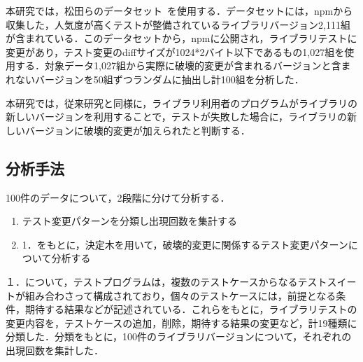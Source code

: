 \documentclass[uplatex,dvipdfmx,a4paper,twocolumn,base=11pt,jbase=11pt,ja=standard]{bxjsarticle}  %
\begin{document}
本研究では，松田らのデータセット~\cite{FOSE2021_Matsuda}を使用する．データセットには，npmから収集した，人気度が高くテストが整備されているライブラリバージョン2,111組が含まれている．このデータセットから，npmに公開され，ライブラリテストに変更があり，テスト変更のdiffサイズが1024*2バイト以下であるもの1,027組を使用する．対象データ1,027組から実際に破壊的変更が含まれるバージョンと含まれないバージョンを50組ずつランダムに抽出し計100組を分析した．


本研究では，従来研究と同様に，ライブラリ利用者のプログラムがライブラリの新しいバージョンを利用することで，テストが失敗した場合に，ライブラリの新しいバージョンに破壊的変更が加えられたと判断する．

\subsection{分析手法}

100件のデータについて，2段階に分けて分析する．
\vspace{-2mm}
\begin{enumerate}
 \item テスト変更パターンを分類し出現回数を集計する
 \item 1．をもとに，決定木を用いて，破壊的変更に関係するテスト変更パターンについて分析する
\end{enumerate}

１．について，テストプログラムは，複数のテストケースからなるテストスイートが組み合わさって構成されており，個々のテストケースには，前提となる条件，期待する結果などが記述されている．これらをもとに，ライブラリテストの変更内容を，テストケースの追加，削除，期待する結果の変更など，計19種類に分類した．分類をもとに，100件のライブラリバージョンについて，それぞれの出現回数を集計した．
\end{document}
